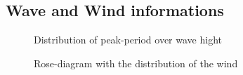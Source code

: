  \subsection{Wave and Wind informations}
\begin{figure}[H]
\center
{}
\caption[Distribution of peak-period over wave hight]{Distribution of peak-period over wave hight}
\end{figure}
% 
% 
\begin{figure}[H]
\center
{}
\caption{Rose-diagram with the distribution of the wind}
\end{figure}
% 
% 
